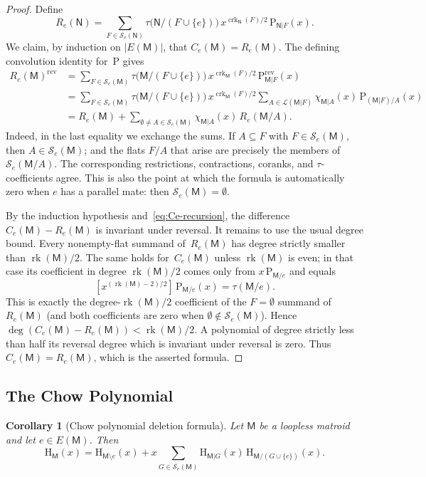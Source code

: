 \documentclass[12pt,letterpaper,english]{amsart}
\theoremstyle{teoremas}
\newtheorem{corollary}[theorem]{Corollary}
\theoremstyle{definition}
\DeclareMathOperator{\rk}{rk}
\DeclareMathOperator{\crk}{crk}
\newcommand{\M}{\mathsf{M}}
\newcommand{\N}{\mathsf{N}}
\renewcommand{\H}{\mathrm{H}}
\newcommand{\PP}{\mathrm{P}}
\newcommand{\rev}{\mathrm{rev}}
\newcommand{\Se}{\mathcal{S}_e}
\begin{document}
\begin{proof}
Define
\[
R_e(\N) = \sum_{F \in \Se(\N)}
  \tau\bigl(\N/(F \cup \{e\})\bigr)\, x^{\crk_{\N}(F)/2}\,
  \PP_{\N|F}(x).
\]
We claim, by induction on $|E(\M)|$, that $C_e(\M) = R_e(\M)$.
The defining convolution identity for~$\PP$ gives
\begin{align*}
R_e(\M)^{\rev}
&= \sum_{F \in \Se(\M)}
  \tau\bigl(\M/(F \cup \{e\})\bigr)\, x^{\crk_{\M}(F)/2}\,
  \PP^{\rev}_{\M|F}(x) \\
&= \sum_{F \in \Se(\M)}
  \tau\bigl(\M/(F \cup \{e\})\bigr)\, x^{\crk_{\M}(F)/2}
  \sum_{A \in \mathcal{L}(\M|F)} \chi_{\M|A}(x)\, \PP_{(\M|F)/A}(x) \\
&= R_e(\M) + \sum_{\emptyset \neq A \in \Se(\M)}
  \chi_{\M|A}(x)\, R_e(\M/A).
\end{align*}
Indeed, in the last equality we exchange the sums.
If $A \subseteq F$ with $F \in \Se(\M)$, then $A \in \Se(\M)$;
and the flats $F/A$ that arise are precisely the members
of~$\Se(\M/A)$.  The corresponding restrictions, contractions,
coranks, and $\tau$-coefficients agree.
This is also the point at which the formula is automatically zero
when $e$ has a parallel mate: then $\Se(\M) = \emptyset$.

By the induction hypothesis and~\eqref{eq:Ce-recursion}, the difference
$C_e(\M) - R_e(\M)$ is invariant under reversal.  It remains to use the
usual degree bound.  Every nonempty-flat summand of~$R_e(\M)$ has degree
strictly smaller than $\rk(\M)/2$.  The same holds for~$C_e(\M)$ unless
$\rk(\M)$ is even; in that case its coefficient in degree $\rk(\M)/2$
comes only from $x\, \PP_{\M/e}$ and equals
\[
[x^{(\rk(\M)-2)/2}]\, \PP_{\M/e}(x) = \tau(\M/e).
\]
This is exactly the degree-$\rk(\M)/2$ coefficient of the $F = \emptyset$
summand of~$R_e(\M)$ (and both coefficients are zero when
$\emptyset \notin \Se(\M)$).  Hence
$\deg(C_e(\M) - R_e(\M)) < \rk(\M)/2$.  A polynomial of degree strictly
less than half its reversal degree which is invariant under reversal
is zero.  Thus $C_e(\M) = R_e(\M)$, which is the asserted formula.
\end{proof}


\subsection{The Chow Polynomial}

\begin{corollary}[Chow polynomial deletion formula]\label{cor:chow-del}
Let $\M$ be a loopless matroid and let $e \in E(\M)$.  Then
\begin{equation}\label{eq:chow-del}
\H_{\M}(x) = \H_{\M \setminus e}(x)
  + x \sum_{G \in \overline{\Se}(\M)}
    \H_{\M|G}(x)\, \H_{\M/(G \cup \{e\})}(x).
\end{equation}
\end{corollary}
\end{document}
